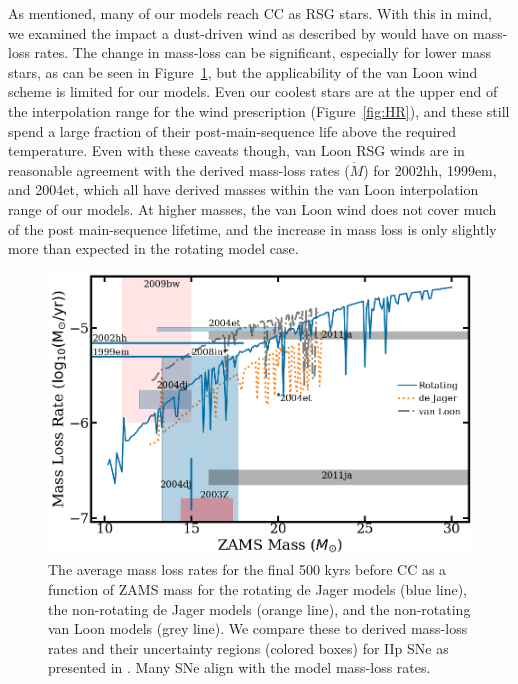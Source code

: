 \documentclass[twocolumn]{aastex631}
\begin{document}
As mentioned, many of our models reach CC as RSG stars. With this in mind, we examined the impact a dust-driven wind as described by \citet{vl05} would have on mass-loss rates. The change in mass-loss can be significant, especially for lower mass stars, as can be seen in Figure~\ref{fig:massloss}, but the applicability of the van Loon wind scheme is limited for our models. Even our coolest stars are at the upper end of the interpolation range for the wind prescription (Figure~\ref{fig:HR}), and these still spend a large fraction of their post-main-sequence life above the required temperature. Even with these caveats though, van Loon RSG winds are in reasonable agreement with the derived mass-loss rates ($\dot{M}$) for 2002hh, 1999em, and 2004et, which all have derived masses within the van Loon interpolation range of our models. At higher masses, the van Loon wind does not cover much of the post main-sequence lifetime, and the increase in mass loss is only slightly more than expected in the rotating model case.

\begin{figure}[hbt!]
    \centering
    \includegraphics[scale=0.25]{mdotdata.png}
    \caption{The average mass loss rates for the final 500 kyrs before CC as a function of ZAMS mass for the rotating de Jager models (blue line), the non-rotating de Jager models (orange line), and the non-rotating van Loon models (grey line). We compare these to derived mass-loss rates and their uncertainty regions (colored boxes) for IIp SNe as presented in \citet{dwarkadas}. Many SNe align with the model mass-loss rates.}
    \label{fig:massloss}
\end{figure}
\end{document}
